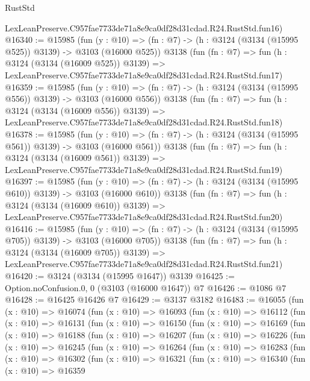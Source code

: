 \begin{lexlean}{RustStd}
\begin{coremodule}
    LexLeanPreserve.C957fae7733de71a8e9ca0df28d31cdad.R24.RustStd.fun16)
@16340 := @15985
    (fun (y : @10) => (fn : @7) -> (h : @3124 (@3134 (@15995 @525)) @3139) -> @3103 (@16000 @525))
    @3138
    (fun (fn : @7) =>
    fun (h : @3124 (@3134 (@16009 @525)) @3139) =>
    LexLeanPreserve.C957fae7733de71a8e9ca0df28d31cdad.R24.RustStd.fun17)
@16359 := @15985
    (fun (y : @10) => (fn : @7) -> (h : @3124 (@3134 (@15995 @556)) @3139) -> @3103 (@16000 @556))
    @3138
    (fun (fn : @7) =>
    fun (h : @3124 (@3134 (@16009 @556)) @3139) =>
    LexLeanPreserve.C957fae7733de71a8e9ca0df28d31cdad.R24.RustStd.fun18)
@16378 := @15985
    (fun (y : @10) => (fn : @7) -> (h : @3124 (@3134 (@15995 @561)) @3139) -> @3103 (@16000 @561))
    @3138
    (fun (fn : @7) =>
    fun (h : @3124 (@3134 (@16009 @561)) @3139) =>
    LexLeanPreserve.C957fae7733de71a8e9ca0df28d31cdad.R24.RustStd.fun19)
@16397 := @15985
    (fun (y : @10) => (fn : @7) -> (h : @3124 (@3134 (@15995 @610)) @3139) -> @3103 (@16000 @610))
    @3138
    (fun (fn : @7) =>
    fun (h : @3124 (@3134 (@16009 @610)) @3139) =>
    LexLeanPreserve.C957fae7733de71a8e9ca0df28d31cdad.R24.RustStd.fun20)
@16416 := @15985
    (fun (y : @10) => (fn : @7) -> (h : @3124 (@3134 (@15995 @705)) @3139) -> @3103 (@16000 @705))
    @3138
    (fun (fn : @7) =>
    fun (h : @3124 (@3134 (@16009 @705)) @3139) =>
    LexLeanPreserve.C957fae7733de71a8e9ca0df28d31cdad.R24.RustStd.fun21)
@16420 := @3124 (@3134 (@15995 @1647)) @3139
@16425 := Option.noConfusion.{0, 0} (@3103 (@16000 @1647)) @7
@16426 := @1086 @7
@16428 := @16425 @16426 @7
@16429 := @3137 @3182
@16483 := @16055
    (fun (x : @10) =>
    @16074
      (fun (x : @10) =>
      @16093
        (fun (x : @10) =>
        @16112
          (fun (x : @10) =>
          @16131
            (fun (x : @10) =>
            @16150
              (fun (x : @10) =>
              @16169
                (fun (x : @10) =>
                @16188
                  (fun (x : @10) =>
                  @16207
                    (fun (x : @10) =>
                    @16226
                      (fun (x : @10) =>
                      @16245
                        (fun (x : @10) =>
                        @16264
                          (fun (x : @10) =>
                          @16283
                            (fun (x : @10) =>
                            @16302
                              (fun (x : @10) =>
                              @16321
                                (fun (x : @10) =>
                                @16340
                                  (fun (x : @10) =>
                                  @16359

\end{coremodule}
\end{lexlean}
